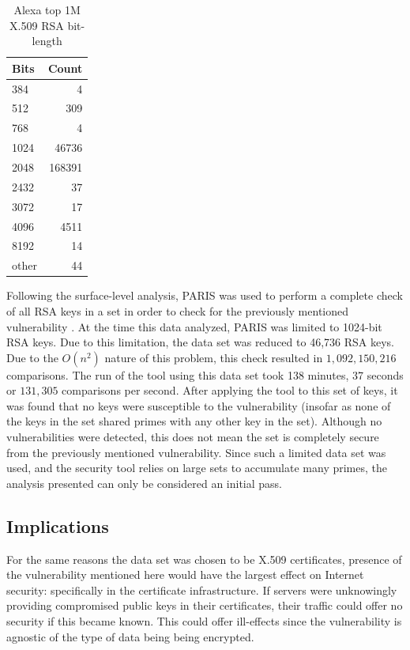 \documentclass[smallextended]{svjour3}       %
\begin{document}
\begin{table}
\centering
\caption{Alexa top 1M X.509 RSA bit-length\label{tab:bits}}
\begin{tabular}{|l|r|}\hline
\textbf{Bits} & \textbf{Count}\\\hline
384 & 4 \\ \hline
512 & 309 \\ \hline
768 & 4 \\ \hline
1024 & 46736 \\ \hline
2048 & 168391 \\ \hline
2432 & 37 \\ \hline
3072 & 17 \\ \hline
4096 & 4511 \\ \hline
8192 & 14 \\ \hline
other & 44 \\ \hline
\end{tabular}
\end{table}

Following the surface-level analysis, PARIS was used to perform a complete
check of all RSA keys in a set in order to check for the previously mentioned
vulnerability \citep{lenstra2012ron}. At the time this data analyzed, PARIS was
limited to 1024-bit RSA keys. Due to this limitation, the data set was reduced
to 46,736 RSA keys. Due to the $O(n^2)$ nature of this problem, this check
resulted in $1,092,150,216$ comparisons. The run of the tool using this data
set took 138 minutes, 37 seconds or $131,305$ comparisons per second.  After
applying the tool to this set of keys, it was found that no keys were
susceptible to the vulnerability (insofar as none of the keys in the set shared
primes with any other key in the set). Although no vulnerabilities were
detected, this does not mean the set is completely secure from the previously
mentioned vulnerability. Since such a limited data set was used, and the
security tool relies on large sets to accumulate many primes, the analysis
presented can only be considered an initial pass.  

\subsection{Implications}
\label{subsec:implications}
For the same reasons the data set was chosen to be X.509 certificates, presence
of the vulnerability mentioned here would have the largest effect on Internet
security: specifically in the certificate infrastructure. If servers were
unknowingly providing compromised public keys in their certificates, their
traffic could offer no security if this became known. This could offer
ill-effects since the vulnerability is agnostic of the type of data being
being encrypted.
\end{document}
